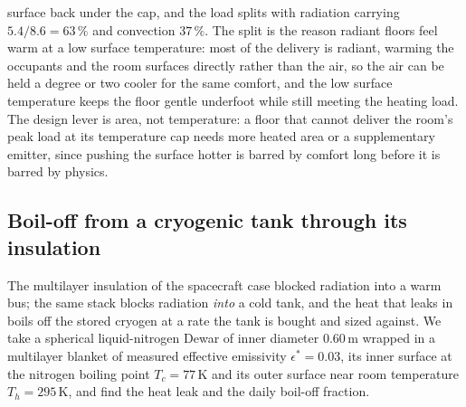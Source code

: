 surface back under the cap, and the load splits with radiation carrying
$5.4/8.6 = 63\,\%$ and convection $37\,\%$. The split is the reason radiant
floors feel warm at a low surface temperature: most of the delivery is
radiant, warming the occupants and the room surfaces directly rather than the
air, so the air can be held a degree or two cooler for the same comfort, and
the low surface temperature keeps the floor gentle underfoot while still
meeting the heating load. The design lever is area, not temperature: a floor
that cannot deliver the room's peak load at its temperature cap needs more
heated area or a supplementary emitter, since pushing the surface hotter is
barred by comfort long before it is barred by physics.

\subsection{Boil-off from a cryogenic tank through its insulation}

The multilayer insulation of the spacecraft case blocked radiation into a
warm bus; the same stack blocks radiation \emph{into} a cold tank, and the
heat that leaks in boils off the stored cryogen at a rate the tank is bought
and sized against. We take a spherical liquid-nitrogen Dewar of inner
diameter $0.60\,\text{m}$ wrapped in a multilayer blanket of measured
effective emissivity $\epsilon^* = 0.03$, its inner surface at the nitrogen
boiling point $T_c = 77\,\si{\kelvin}$ and its outer surface near room
temperature $T_h = 295\,\si{\kelvin}$, and find the heat leak and the daily
boil-off fraction.

